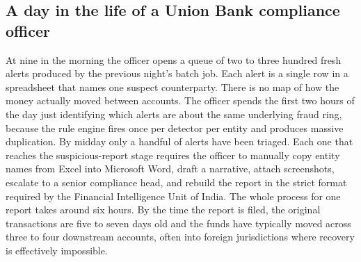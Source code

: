 \documentclass[10pt,a4paper]{article}
\begin{document}
\subsection*{A day in the life of a Union Bank compliance officer}
At nine in the morning the officer opens a queue of two to three hundred fresh alerts produced by the previous night's batch job. Each alert is a single row in a spreadsheet that names one suspect counterparty. There is no map of how the money actually moved between accounts. The officer spends the first two hours of the day just identifying which alerts are about the same underlying fraud ring, because the rule engine fires once per detector per entity and produces massive duplication. By midday only a handful of alerts have been triaged. Each one that reaches the suspicious-report stage requires the officer to manually copy entity names from Excel into Microsoft Word, draft a narrative, attach screenshots, escalate to a senior compliance head, and rebuild the report in the strict format required by the Financial Intelligence Unit of India. The whole process for one report takes around six hours. By the time the report is filed, the original transactions are five to seven days old and the funds have typically moved across three to four downstream accounts, often into foreign jurisdictions where recovery is effectively impossible.
\end{document}
